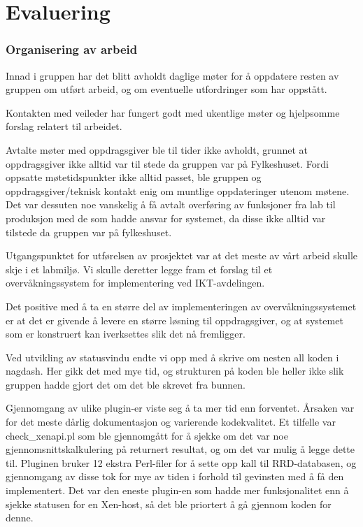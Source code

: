 \section{Evaluering}
\subsubsection{Organisering av arbeid}
Innad i gruppen har det blitt avholdt daglige møter for å oppdatere resten av gruppen om utført arbeid, og om eventuelle utfordringer som har oppstått. 

Kontakten med veileder har fungert godt med ukentlige møter og hjelpsomme forslag relatert til arbeidet.

Avtalte møter med oppdragsgiver ble til tider ikke avholdt, grunnet at oppdragsgiver ikke alltid var til stede da gruppen var på Fylkeshuset. Fordi oppsatte møtetidspunkter ikke alltid passet, ble gruppen og oppdragsgiver/teknisk kontakt enig om muntlige oppdateringer utenom møtene. Det var dessuten noe vanskelig å få avtalt overføring av funksjoner fra lab til produksjon med de som hadde ansvar for systemet, da disse ikke alltid var tilstede da gruppen var på fylkeshuset. 

Utgangspunktet for utførelsen av prosjektet var at det meste av vårt arbeid skulle skje i et labmiljø. Vi skulle deretter legge fram et forslag til et overvåkningssystem for implementering ved IKT-avdelingen.

Det positive med å ta en større del av implementeringen av overvåkningssystemet er at det er givende å levere en større løsning til oppdragsgiver, og at systemet som er konstruert kan iverksettes slik det nå fremligger.

Ved utvikling av statusvindu endte vi opp med å skrive om nesten all koden i nagdash. Her gikk det med mye tid, og strukturen på koden ble heller ikke slik gruppen hadde gjort det om det ble skrevet fra bunnen. 

Gjennomgang av ulike plugin-er viste seg å ta mer tid enn forventet. Årsaken var for det meste dårlig dokumentasjon og varierende kodekvalitet. Et tilfelle var check\_xenapi.pl som ble gjennomgått for å sjekke om det var noe gjennomsnittskalkulering på returnert resultat, og om det var mulig å legge dette til. Pluginen bruker 12 ekstra Perl-filer for å sette opp kall til RRD-databasen, og gjennomgang av disse tok for mye av tiden i forhold til gevinsten med å få den implementert. Det var den eneste plugin-en som hadde mer funksjonalitet enn å sjekke statusen for en Xen-host, så det ble priortert å gå gjennom koden for denne. 

